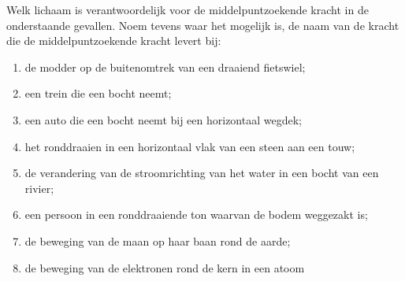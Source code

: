 


\item Welk lichaam is verantwoordelijk voor de middelpuntzoekende kracht in de onderstaande gevallen. Noem tevens waar het mogelijk
is, de naam van de kracht die de middelpuntzoekende kracht levert bij:
\begin{enumerate}
\item de modder op de buitenomtrek van een draaiend fietswiel;
\item een trein die een bocht neemt;
\item een auto die een bocht neemt bij een horizontaal wegdek;
\item het ronddraaien in een horizontaal vlak van een steen aan een touw;
\item de verandering van de stroomrichting van het water in een bocht van een rivier;
\item een persoon in een ronddraaiende ton waarvan de bodem weggezakt is;
\item de beweging van de maan op haar baan rond de aarde;
\item de beweging van de elektronen rond de kern in een atoom
\end{enumerate}